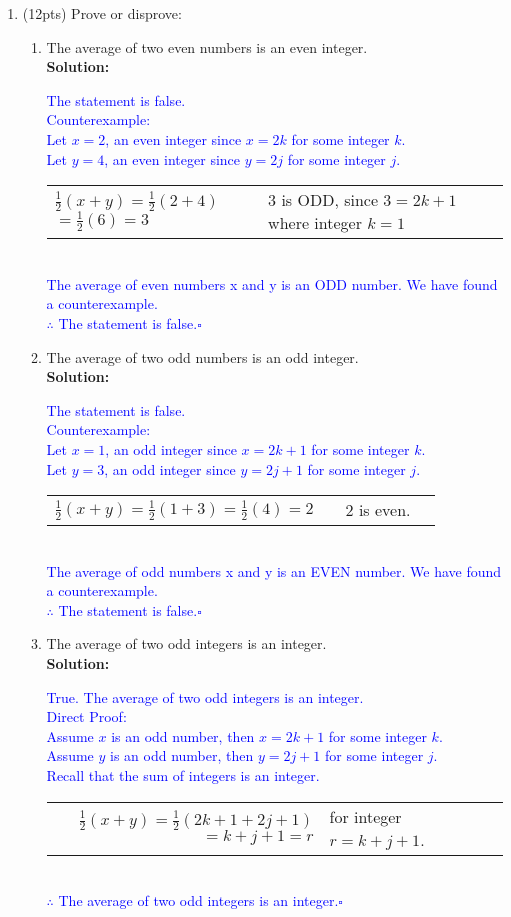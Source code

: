 \documentclass{article}
\newcommand{\sol}[1]{\textbf{Solution:\,}\textcolor{blue}{#1}}
\begin{document}
\begin{enumerate}
\item(12pts) Prove or disprove:
\begin{enumerate}
\item The average of two even numbers is an even integer.
\\\sol{The statement is false.
\\Counterexample:
\\Let $x=2$, an even integer since $x=2k$ for some integer $k$.
\\Let $y=4$, an even integer since $y=2j$ for some integer $j$.
\\\begin{tabular}{llll}
$\frac{1}{2}(x+y)$$=\frac{1}{2}(2+4)$$=\frac{1}{2}(6)$$=3$&&$3$ is ODD, since $3=2k+1$ where integer $k=1$
\end{tabular}
\\The average of even numbers x and y is an ODD number. We have found a counterexample.
\\$\therefore$ The statement is false.\hfill$\square$
}
\item The average of two odd numbers is an odd integer.
\\\sol{The statement is false.
\\Counterexample:
\\Let $x=1$, an odd integer since $x=2k+1$ for some integer $k$.
\\Let $y=3$, an odd integer since $y=2j+1$ for some integer $j$.
\\\begin{tabular}{rlll}
$\frac{1}{2}(x+y)$$=\frac{1}{2}(1+3)$$=\frac{1}{2}(4)$$=2$&&$2$ is even.\\
\end{tabular}
\\The average of odd numbers x and y is an EVEN number. We have found a counterexample.
\\$\therefore$ The statement is false.\hfill$\square$
}
\item The average of two odd integers is an integer.
\\\sol{True. The average of two odd integers is an integer.
\\Direct Proof:
\\Assume $x$ is an odd number, then $x=2k+1$ for some integer $k$.
\\Assume $y$ is an odd number, then $y=2j+1$ for some integer $j$.
\\Recall that the sum of integers is an integer.
\\\begin{tabular}{rlll}
$\frac{1}{2}(x+y)$$=\frac{1}{2}(2k+1+2j+1)$$=k+j+1$$=r$&for integer $r=k+j+1$.
\end{tabular}\\
$\therefore$ The average of two odd integers is an integer.\hfill$\square$
}
\end{enumerate}


\end{enumerate}
\end{document}
